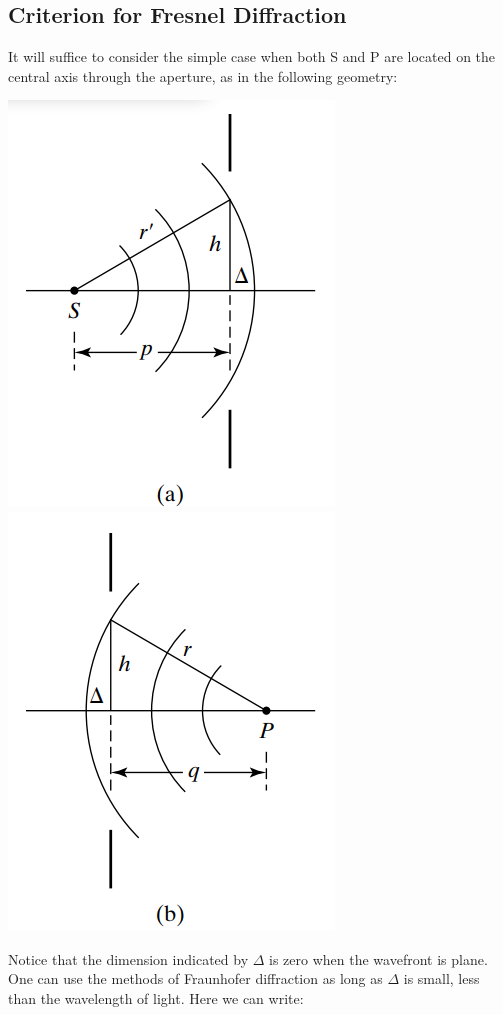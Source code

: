 \documentclass[11pt]{book}
\theoremstyle{break}
\theoremstyle{break}
\begin{document}
\subsection{Criterion for Fresnel 
Diffraction}
It will suffice to consider the simple
case when both S and P are located on the central axis through the aperture,
as in the following geometry: 
\begin{center}
\includegraphics[scale=0.75]{FresnelP}
\qquad\qquad\qquad
\includegraphics[scale=0.75]{FresnelQ}
\end{center}
Notice that the dimension indicated by $\Delta$ is zero when the wavefront is plane. One can use the methods of Fraunhofer diffraction as long as $\Delta$ is small, less than the wavelength of light. Here we can write:
\end{document}
